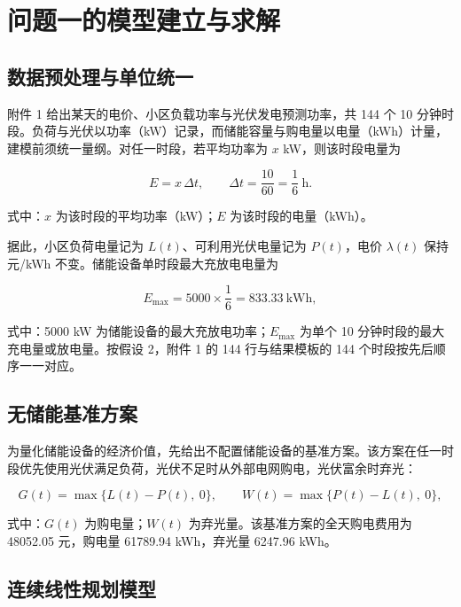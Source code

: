 \section{问题一的模型建立与求解}

\subsection{数据预处理与单位统一}

附件 1 给出某天的电价、小区负载功率与光伏发电预测功率，共 144 个 10 分钟时段。负荷与光伏以功率（kW）记录，而储能容量与购电量以电量（kWh）计量，建模前须统一量纲。对任一时段，若平均功率为 $x$ kW，则该时段电量为

\begin{equation}
  E = x\,\Delta t, \qquad \Delta t = \frac{10}{60} = \frac{1}{6}\ \mathrm{h}.
  \label{eq:unit}
\end{equation}

式中：$x$ 为该时段的平均功率（kW）；$E$ 为该时段的电量（kWh）。

据此，小区负荷电量记为 $L(t)$、可利用光伏电量记为 $P(t)$，电价 $\lambda(t)$ 保持元/kWh 不变。储能设备单时段最大充放电电量为

\begin{equation}
  E_{\max} = 5000 \times \frac{1}{6} = 833.33\ \mathrm{kWh},
  \label{eq:emax}
\end{equation}

式中：5000 kW 为储能设备的最大充放电功率；$E_{\max}$ 为单个 10 分钟时段的最大充电量或放电量。按假设 2，附件 1 的 144 行与结果模板的 144 个时段按先后顺序一一对应。

\subsection{无储能基准方案}

为量化储能设备的经济价值，先给出不配置储能设备的基准方案。该方案在任一时段优先使用光伏满足负荷，光伏不足时从外部电网购电，光伏富余时弃光：

\begin{equation}
  G(t) = \max\{L(t)-P(t),\ 0\}, \qquad W(t) = \max\{P(t)-L(t),\ 0\},
  \label{eq:nostorage}
\end{equation}

式中：$G(t)$ 为购电量；$W(t)$ 为弃光量。该基准方案的全天购电费用为 48052.05 元，购电量 61789.94 kWh，弃光量 6247.96 kWh。

\subsection{连续线性规划模型}

